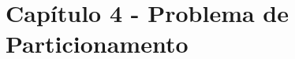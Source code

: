 \documentclass[portugues, brazil, a4paper,12pt]{article}
\begin{document}


\part{Capítulo 4 - Problema de Particionamento}


%

\end{document}
